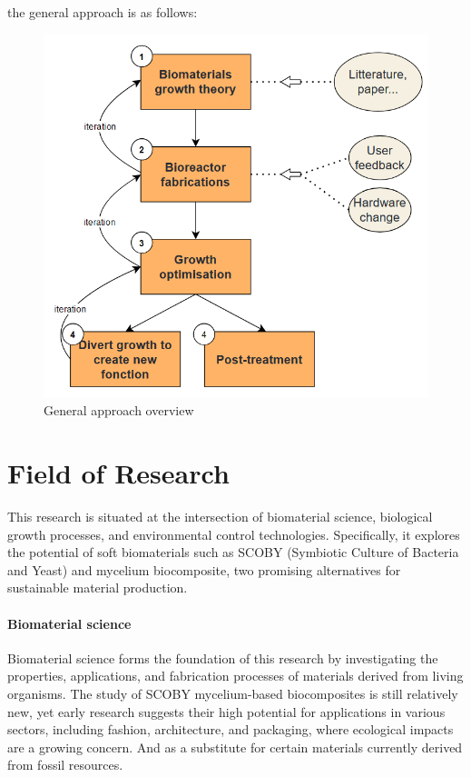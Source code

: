 the general approach is as follows: 

\begin{figure}[h]
    \centering
    \includegraphics{images/diag_approche.png}
    \caption{General approach overview}
    \label{fig:IS_demo}
\end{figure}


\section{Field of Research}

This research is situated at the intersection of biomaterial science, biological growth processes, and environmental control technologies. Specifically, 
it explores the potential of soft biomaterials such as SCOBY (Symbiotic Culture of Bacteria and Yeast) and mycelium biocomposite, two promising alternatives 
for sustainable material production. 

\paragraph[short]{Biomaterial science} 
Biomaterial science forms the foundation of this research by investigating the properties, applications, and fabrication processes of materials derived from living organisms. 
The study of SCOBY mycelium-based biocomposites is still relatively new, yet early research suggests their high potential for applications in various sectors, including fashion\cite{amobonye2023fungal}, architecture\cite{ghazvinian2019mycelium}, and packaging\cite{abhijith2018sustainable}, where ecological impacts are a growing concern. And as a substitute for certain materials currently derived from fossil resources\cite{jang2017bacterial}.

